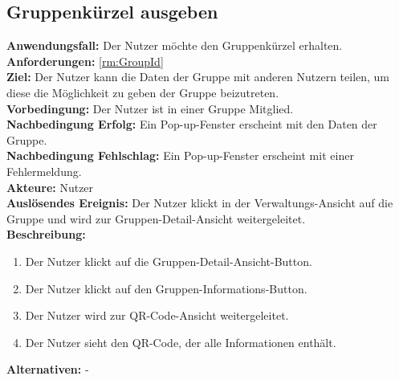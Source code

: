 \documentclass[parskip=full]{scrartcl}
\begin{document}
\subsection{Gruppenkürzel ausgeben}
\textbf{Anwendungsfall:} Der Nutzer möchte den Gruppenkürzel erhalten.\\
\textbf{Anforderungen:} \ref{rm:GroupId}\\
\textbf{Ziel:} Der Nutzer kann die Daten der Gruppe mit anderen Nutzern teilen, um diese die Möglichkeit zu geben der Gruppe beizutreten.\\
\textbf{Vorbedingung:} Der Nutzer ist in einer Gruppe Mitglied.\\
\textbf{Nachbedingung Erfolg:} Ein Pop-up-Fenster erscheint mit den Daten der Gruppe.\\
\textbf{Nachbedingung Fehlschlag:} Ein Pop-up-Fenster erscheint mit einer Fehlermeldung.\\
\textbf{Akteure:} Nutzer \\
\textbf{Auslösendes Ereignis:} Der Nutzer klickt in der Verwaltungs-Ansicht auf die Gruppe und wird zur Gruppen-Detail-Ansicht weitergeleitet.\\
\textbf{Beschreibung:}
\begin{enumerate}
    \item Der Nutzer klickt auf die Gruppen-Detail-Ansicht-Button.
    \item Der Nutzer klickt auf den Gruppen-Informations-Button.
    \item Der Nutzer wird zur QR-Code-Ansicht weitergeleitet.
    \item Der Nutzer sieht den QR-Code, der alle Informationen enthält.
\end{enumerate}
\textbf{Alternativen:} -
\newpage
\end{document}
